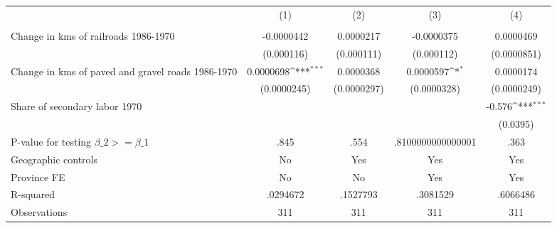 {
\def\sym#1{\ifmmode^{#1}\else\(^{#1}\)\fi}
\begin{tabular}{l*{4}{c}}
\hline\hline
                &\multicolumn{1}{c}{(1)}&\multicolumn{1}{c}{(2)}&\multicolumn{1}{c}{(3)}&\multicolumn{1}{c}{(4)}\\
                &\multicolumn{1}{c}{}&\multicolumn{1}{c}{}&\multicolumn{1}{c}{}&\multicolumn{1}{c}{}\\
\hline
Change in kms of railroads 1986-1970&-0.0000442         &0.0000217         &-0.0000375         &0.0000469         \\
                &(0.000116)         &(0.000111)         &(0.000112)         &(0.0000851)         \\
[1em]
Change in kms of paved and gravel roads 1986-1970&0.0000698\sym{***}&0.0000368         &0.0000597\sym{*}  &0.0000174         \\
                &(0.0000245)         &(0.0000297)         &(0.0000328)         &(0.0000249)         \\
[1em]
Share of secondary labor 1970&                  &                  &                  &   -0.576\sym{***}\\
                &                  &                  &                  & (0.0395)         \\
\hline
P-value for testing $\beta\_{2} >= \beta\_{1}$&     .845         &     .554         &.8100000000000001         &     .363         \\
Geographic controls&       No         &      Yes         &      Yes         &      Yes         \\
Province FE     &       No         &       No         &      Yes         &      Yes         \\
R-squared       & .0294672         & .1527793         & .3081529         & .6066486         \\
Observations    &      311         &      311         &      311         &      311         \\
\hline\hline
\end{tabular}
}
